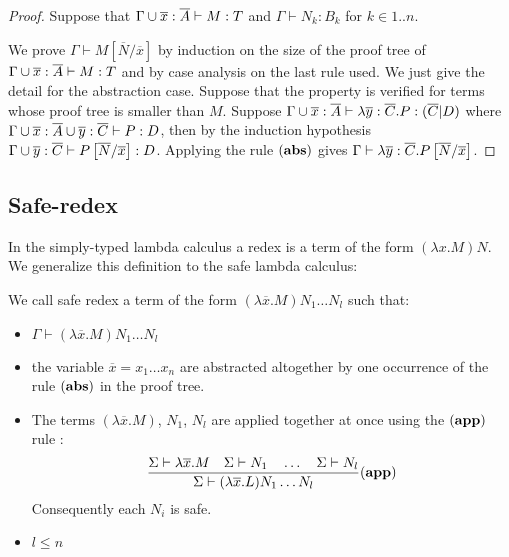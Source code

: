 \begin{proof}
Suppose that $\Gamma \cup \overline{x}: \overline{A} \vdash M :T$ and
$\Gamma \vdash N_k : B_k$ for $k \in 1..n$.

We prove $\Gamma \vdash M[\overline{N}/\overline{x}]$ by induction
on the size of the proof tree of $\Gamma\cup \overline{x}:\overline{A}
\vdash M : T$ and by case analysis on the last rule used. We just
give the detail for the abstraction case. Suppose that the property
is verified for terms whose proof tree is smaller than $M$. Suppose
$\Gamma \cup \overline{x}:\overline{A} \vdash \lambda \overline{y} :
\overline{C}. P : (\overline{C}|D)$ where $\Gamma\cup
\overline{x}:\overline{A}\cup \overline{y}:\overline{C} \vdash P :
D$, then by the induction hypothesis $\Gamma\cup
\overline{y}:\overline{C} \vdash
P\left[ \overline{N}/\overline{x} \right] : D$. Applying the rule
$\mathbf{(abs)}$ gives $\Gamma \vdash \lambda
\overline{y}:\overline{C} . P \left[ \overline{N}/\overline{x} \right]$.
\end{proof}

\subsection{Safe-redex}
In the simply-typed lambda calculus a redex is a term of the form
$(\lambda x . M) N$. We generalize this definition to the safe
lambda calculus:
\begin{dfn}
We call safe redex a term of the form $(\lambda \overline{x} . M)
N_1 \ldots N_l$ such that:
\begin{itemize}
\item $ \Gamma \vdash (\lambda \overline{x} . M) N_1 \ldots N_l $
\item the variable $\overline{x}=x_1\ldots x_n$ are abstracted altogether by one occurrence of the rule $\mathbf{(abs)}$ in the proof tree.
\item The terms $(\lambda \overline{x} . M)$, $N_1$, $N_l$ are applied together at once using the $\mathbf{(app)}$ rule :
$$   \frac{\displaystyle 
            \Sigma \vdash \lambda \overline{x} . M
            \quad
            \Sigma \vdash N_1         \quad \ldots \quad \Sigma \vdash N_l
    }{
       \Sigma \vdash (\lambda \overline{x} . L) N_1 \ldots N_l
    } (\mathbf{app})
$$
Consequently each $N_i$ is safe.

\item $l\leq n$
\end{itemize}
\end{dfn}

